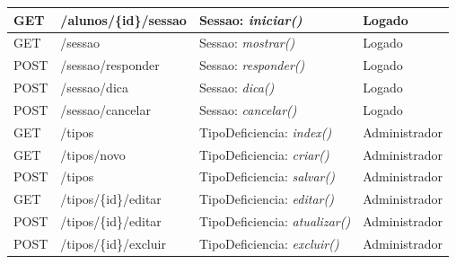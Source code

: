 \begin{tabelaIFTO}
\begin{longtable}{|L{0.0981}|L{0.3709}|L{0.3585}|L{0.1725}|}
GET & /alunos/\{id\}/sessao & Sessao: \textit{iniciar()} & Logado \\ \hline
GET & /sessao & Sessao: \textit{mostrar()} & Logado \\ \hline
POST & /sessao/responder & Sessao: \textit{responder()} & Logado \\ \hline
POST & /sessao/dica & Sessao: \textit{dica()} & Logado \\ \hline
POST & /sessao/cancelar & Sessao: \textit{cancelar()} & Logado \\ \hline
GET & /tipos & TipoDeficiencia: \textit{index()} & Administrador \\ \hline
GET & /tipos/novo & TipoDeficiencia: \textit{criar()} & Administrador \\ \hline
POST & /tipos & TipoDeficiencia: \textit{salvar()} & Administrador \\ \hline
GET & /tipos/\{id\}/editar & TipoDeficiencia: \textit{editar()} & Administrador \\ \hline
POST & /tipos/\{id\}/editar & TipoDeficiencia: \textit{atualizar()} & Administrador \\ \hline
POST & /tipos/\{id\}/excluir & TipoDeficiencia: \textit{excluir()} & Administrador \\ \hline
\end{longtable}
\end{tabelaIFTO}
